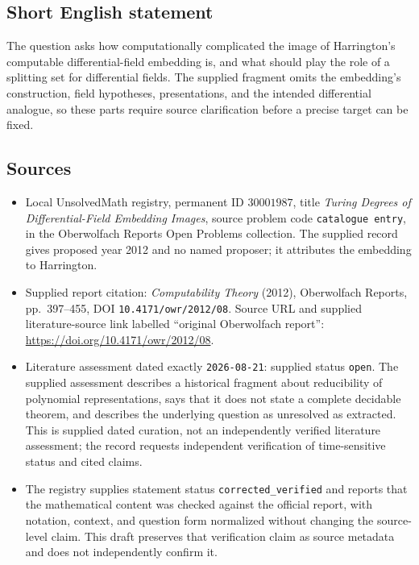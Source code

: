 \documentclass[11pt]{article}
\begin{document}
\subsection{Short English statement}
The question asks how computationally complicated the image of Harrington's computable differential-field embedding is, and what should play the role of a splitting set for differential fields. The supplied fragment omits the embedding's construction, field hypotheses, presentations, and the intended differential analogue, so these parts require source clarification before a precise target can be fixed.
\subsection{Sources}
\begin{itemize}
\item Local UnsolvedMath registry, permanent ID \(30001987\), title \emph{Turing Degrees of Differential-Field Embedding Images}, source problem code \texttt{catalogue entry}, in the Oberwolfach Reports Open Problems collection. The supplied record gives proposed year 2012 and no named proposer; it attributes the embedding to Harrington.
\item Supplied report citation: \emph{Computability Theory} (2012), Oberwolfach Reports, pp.\ 397--455, DOI \texttt{10.4171/owr/2012/08}. Source URL and supplied literature-source link labelled ``original Oberwolfach report'': \url{https://doi.org/10.4171/owr/2012/08}.
\item Literature assessment dated exactly \texttt{2026-08-21}: supplied status \texttt{open}. The supplied assessment describes a historical fragment about reducibility of polynomial representations, says that it does not state a complete decidable theorem, and describes the underlying question as unresolved as extracted. This is supplied dated curation, not an independently verified literature assessment; the record requests independent verification of time-sensitive status and cited claims.
\item The registry supplies statement status \texttt{corrected\_verified} and reports that the mathematical content was checked against the official report, with notation, context, and question form normalized without changing the source-level claim. This draft preserves that verification claim as source metadata and does not independently confirm it.
\end{itemize}
\end{document}
